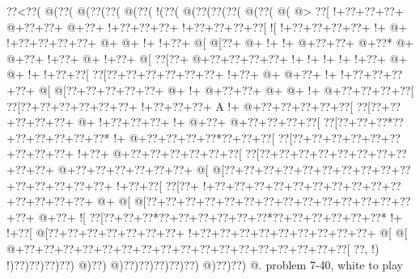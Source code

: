 \vbox{\vbox{\goo
\0??<\0??(\- @(\0??(\- @(\0??(\0??(\- @(\0??(\- !(\0??(\- @(\0??(\0??(\0??(\- @(\0??(\- @(\- @>
\0??[\- !+\0??+\0??+\0??+\- @+\0??+\0??+\- @+\0??+\- !+\0??+\0??+\0??+\- !+\0??+\0??+\0??+\0??[
\- ![\- !+\0??+\0??+\0??+\0??+\- !+\- @+\- !+\0??+\0??+\0??+\0??+\- @+\- @+\- !+\- !+\0??+\- @[
\- @[\0??+\- @+\- !+\- !+\- @+\0??+\0??+\- @+\0??*\- @+\- @+\0??+\- !+\0??+\- @+\- !+\0??+\- @[
\0??[\0??+\- @+\0??+\0??+\0??+\0??+\- !+\- !+\- !+\- !+\- !+\0??+\- @+\- @+\- !+\- !+\0??+\0??[
\0??[\0??+\0??+\0??+\0??+\0??+\0??+\- !+\0??+\- @+\- @+\0??+\- !+\- !+\0??+\0??+\0??+\0??+\- @[
\- @[\0??+\0??+\0??+\0??+\0??+\- @+\- !+\- @+\0??+\0??+\- @+\- @+\- !+\- @+\0??+\0??+\0??+\0??[
\0??[\0??+\0??+\0??+\0??+\0??+\0??+\- !+\0??+\0??+\0??+\!  A\- !+\- @+\0??+\0??+\0??+\0??+\0??[
\0??[\0??+\0??+\0??+\0??+\0??+\- @+\- !+\0??+\0??+\0??+\- !+\- @+\0??+\- @+\0??+\0??+\0??+\0??[
\0??[\0??+\0??+\0??*\0??+\0??+\0??+\0??+\0??+\0??*\- !+\- @+\0??+\0??+\0??+\0??*\0??+\0??+\0??[
\0??[\0??+\0??+\0??+\0??+\0??+\0??+\0??+\0??+\0??+\- !+\0??+\- @+\0??+\0??+\0??+\0??+\0??+\0??[
\0??[\0??+\0??+\0??+\0??+\0??+\0??+\0??+\0??+\0??+\0??+\- @+\0??+\0??+\0??+\0??+\0??+\0??+\- @[
\- @[\0??+\0??+\0??+\0??+\0??+\0??+\0??+\0??+\0??+\0??+\0??+\0??+\0??+\0??+\0??+\- !+\0??+\0??[
\0??[\0??+\- !+\0??+\0??+\0??+\0??+\0??+\0??+\0??+\0??+\0??+\0??+\0??+\0??+\0??+\0??+\- @+\- @[
\- @[\0??+\0??+\0??+\0??+\0??+\0??+\0??+\0??+\0??+\0??+\0??+\0??+\0??+\0??+\0??+\- @+\0??+\- ![
\0??[\0??+\0??+\0??*\0??+\0??+\0??+\0??+\0??+\0??*\0??+\0??+\0??+\0??+\0??+\0??*\- !+\- !+\0??[
\- @[\0??+\0??+\0??+\0??+\0??+\0??+\0??+\- !+\0??+\0??+\0??+\0??+\0??+\0??+\0??+\0??+\0??+\- @[
\- @[\- @+\0??+\0??+\0??+\0??+\0??+\0??+\0??+\0??+\0??+\0??+\0??+\0??+\0??+\0??+\0??+\0??+\0??[
\0??,\- !)\- !)\0??)\0??)\0??)\0??)\- @)\0??)\- @)\0??)\0??)\0??)\0??)\0??)\- @)\0??)\0??)\- @.
}
\hfil problem 7-40, white to play\hfil\break
}

